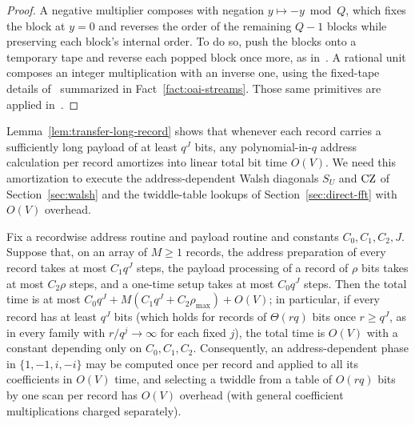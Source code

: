 \begin{proof}
A negative multiplier composes with negation $y\mapsto-y\bmod Q$, which fixes the block at $y=0$ and reverses the order of the remaining $Q-1$ blocks while preserving each block's internal order. To do so, push the blocks onto a temporary tape and reverse each popped block once more, as in~\cite[proof of Lemma~4, \S2.1]{OAI26}. A rational unit composes an integer multiplication with an inverse one, using the fixed-tape details of~\cite[Lemmas~3--4, \S2.1]{OAI26} summarized in Fact~\ref{fact:oai-streams}. Those same primitives are applied in~\cite[proof of Lemma~10, proof of Prop.~11, \S5.2, and \S5.3 (25)]{OAI26}.
\end{proof}

Lemma~\ref{lem:transfer-long-record} shows that whenever each record carries a sufficiently long payload of at least $q^J$ bits, any polynomial-in-$q$ address calculation per record amortizes into linear total bit time $O(V)$. We need this amortization to execute the address-dependent Walsh diagonals $S_U$ and $\mathrm{CZ}$ of Section~\ref{sec:walsh} and the twiddle-table lookups of Section~\ref{sec:direct-fft} with $O(V)$ overhead.

\begin{lemma}\label{lem:transfer-long-record}
Fix a recordwise address routine and payload routine and constants $C_0,C_1,C_2,J$. Suppose that, on an array of
$M\ge1$ records, the address preparation of every record takes at most $C_1q^J$ steps, the payload processing of a
record of $\rho$ bits takes at most $C_2\rho$ steps, and a one-time setup takes at most $C_0q^J$ steps. Then the total
time is at most $C_0q^J+M(C_1q^J+C_2\rho_{\max})+O(V)$; in particular, if every record has at least $q^J$ bits (which
holds for records of $\Theta(rq)$ bits once $r\ge q^J$, as in every family with $r/q^j\to\infty$ for each fixed $j$),
the total time is $O(V)$ with a constant depending only on $C_0,C_1,C_2$. Consequently, an address-dependent phase in
$\{1,-1,i,-i\}$ may be computed once per record and applied to all its coefficients in $O(V)$ time, and selecting a
twiddle from a table of $O(rq)$ bits by one scan per record has $O(V)$ overhead (with general coefficient
multiplications charged separately).
\end{lemma}

